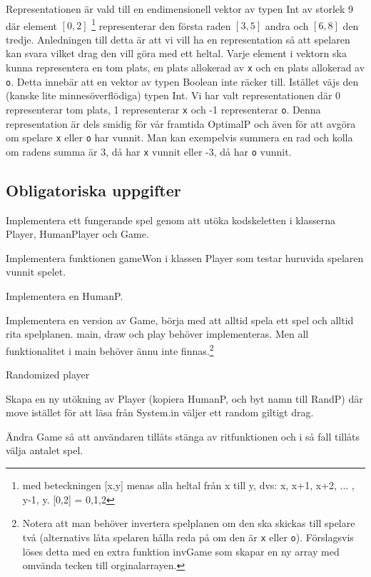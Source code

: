 Representationen är vald till en endimensionell vektor av typen Int av storlek 9 där element $[0,2]$ \footnote{med beteckningen [x,y] menas alla heltal från x till y, dvs: x, x+1, x+2, ... , y-1, y. [0,2] = {0,1,2}} representerar den första raden $[3,5]$ andra och $[6,8]$ den tredje. Anledningen till detta är att vi vill ha en representation så att spelaren kan svara vilket drag den vill göra med ett heltal.
Varje element i vektorn ska kunna representera en tom plats, en plats allokerad av \texttt{x} och en plats allokerad av \texttt{o}. Detta innebär att en vektor av typen Boolean inte räcker till. Istället väjs den (kanske lite minnesöverflödiga) typen Int. Vi har valt representationen där 0 representerar tom plats, 1 representerar \texttt{x} och -1 representerar \texttt{o}. Denna representation är dels smidig för vår framtida OptimalP och även för att avgöra om spelare \texttt{x} eller \texttt{o} har vunnit. Man kan exempelvis summera en rad och kolla om radens summa är 3, då har \texttt{x} vunnit eller -3, då har \texttt{o} vunnit.
 
\subsection{Obligatoriska uppgifter}

\Task Implementera ett fungerande spel genom att utöka kodskeletten i klasserna Player, HumanPlayer och Game.

\Subtask Implementera funktionen gameWon i klassen Player som testar huruvida spelaren  vunnit spelet.

\Subtask Implementera en HumanP.

\Subtask Implementera en version av Game, börja med att alltid spela ett spel och alltid rita spelplanen. main, draw och play behöver implementeras. Men all funktionalitet i main behöver ännu inte finnas.\footnote{Notera att man behöver invertera spelplanen om den ska skickas till spelare två (alternativs låta spelaren hålla reda på om den är \texttt{x} eller \texttt{o}). Förslagsvis löses detta med en extra funktion invGame som skapar en ny array med omvända tecken till orginalarrayen.}

\Task Randomized player

\Subtask Skapa en ny utökning av Player (kopiera HumanP, och byt namn till RandP) där move istället för att läsa från System.in väljer ett random giltigt drag.

\Subtask Ändra Game så att användaren tillåts stänga av ritfunktionen och i så fall tillåts välja antalet spel.

